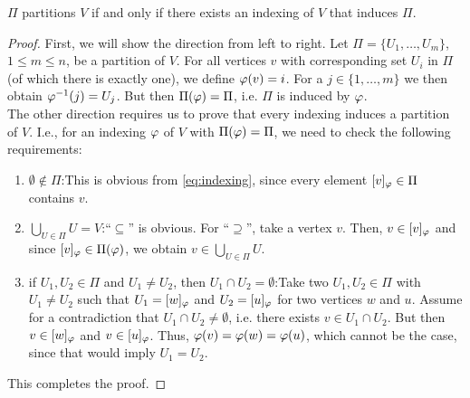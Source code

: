 \begin{samepage}
    \begin{lemmarep}
        $\Pi$ partitions $V$ if and only if there exists an indexing of $V$ that induces $\Pi$.\label{lemma:indexing_partition}
    \end{lemmarep}
\end{samepage}
\begin{proof}
    First, we will show the direction from left to right. Let $\Pi = \{U_1,\dots,U_m\}$, $1\leq m \leq n$, be a partition of $V$. For all vertices $v$ with corresponding set $U_i$ in $\Pi$ (of which there is exactly one), we define $\varphi(v) = i$. For a $j \in \{1,\dots,m\}$ we then obtain $\varphi^{-1}(j) = U_j$. But then $\Pi(\varphi) = \Pi$, i.e. $\Pi$ is induced by $\varphi$. 
    \\
    The other direction requires us to prove that every indexing induces a partition of $V$. I.e., for an indexing $\varphi$ of $V$ with $\Pi(\varphi)=\Pi$, we need to check the following requirements:
    \begin{enumerate}
        \item $\emptyset \not\in \Pi$:\quad This is obvious from \eqref{eq:indexing}, since every element $[v]_\varphi \in \Pi$ contains $v$. %
        \item $\bigcup_{U \in \Pi} U = V$:\quad ``$\subseteq$'' is obvious. For ``$\supseteq$'', take a vertex $v$. Then, $v \in [v]_\varphi$ and since $[v]_\varphi \in \Pi(\varphi)$, we obtain $v \in \bigcup_{U \in \Pi} U$.
        \item if $U_1,U_2 \in \Pi$ and $U_1 \neq U_2$, then $U_1 \cap U_2 = \emptyset$:\quad Take two $U_1, U_2 \in \Pi$ with $U_1 \neq U_2$ such that $U_1 = [w]_\varphi$ and $U_2 = [u]_\varphi$ for two vertices $w$ and $u$. Assume for a contradiction that $U_1 \cap U_2 \neq \emptyset$, i.e. there exists $v \in U_1 \cap U_2$. But then $v \in [w]_\varphi$ and $v \in [u]_\varphi$. Thus, $\varphi(v) = \varphi(w) = \varphi(u)$, which cannot be the case, since that would imply $U_1 = U_2$.
    \end{enumerate}
    This completes the proof.
\end{proof}

